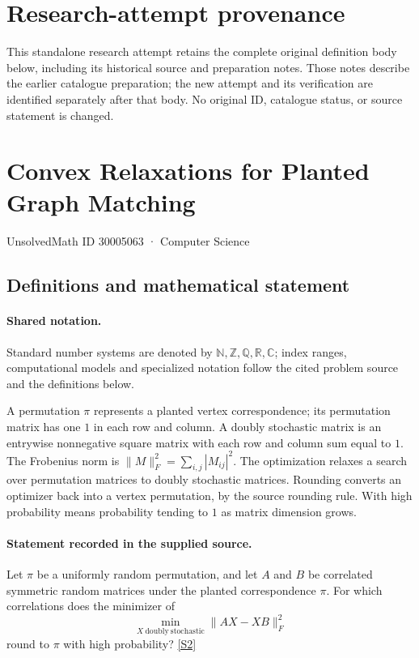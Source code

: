 \documentclass[11pt]{article}
\begin{document}
\section*{Research-attempt provenance}
This standalone research attempt retains the complete original definition body below,
including its historical source and preparation notes. Those notes describe the
earlier catalogue preparation; the new attempt and its verification are identified
separately after that body. No original ID, catalogue status, or source statement is changed.

\section{Convex Relaxations for Planted Graph Matching}\label{30005063}
{\small UnsolvedMath ID 30005063 · Computer Science}
\subsection{Definitions and mathematical statement}

\paragraph{Shared notation.}Standard number systems are denoted by $\mathbb N,\mathbb Z,\mathbb Q,\mathbb R,\mathbb C$; index ranges, computational models and specialized notation follow the cited problem source and the definitions below.


A permutation $\pi$ represents a planted vertex correspondence; its permutation matrix has one $1$ in each row and column. A doubly stochastic matrix is an entrywise nonnegative square matrix with each row and column sum equal to $1$. The Frobenius norm is $\lVert M\rVert_F^2=\sum_{i,j}|M_{ij}|^2$. The optimization relaxes a search over permutation matrices to doubly stochastic matrices. Rounding converts an optimizer back into a vertex permutation, by the source rounding rule. With high probability means probability tending to $1$ as matrix dimension grows.
\paragraph{Statement recorded in the supplied source.}
Let $\pi$ be a uniformly random permutation, and let $A$ and $B$ be correlated symmetric random matrices under the planted correspondence $\pi$. For which correlations does the minimizer of
$$
\min_{X\ \mathrm{doubly\ stochastic}}\|AX-XB\|_F^2
$$
round to $\pi$ with high probability? \href{https://doi.org/10.4171/owr/2022/14}{[S2]}
\end{document}
